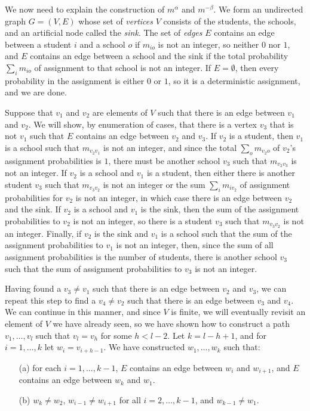 \documentclass[12pt]{article}
\theoremstyle{definition}
\begin{document}
We now need to explain the construction of $m^\alpha$ and
$m^{-\beta}$.  We form an undirected graph $G = (V,E)$ whose set of
\emph{vertices} $V$ consists of the students, the schools, and an
artificial node called the \emph{sink}. The set of \emph{edges} $E$
contains an edge between a student $i$ and a school $o$ if $m_{io}$ is
not an integer, so neither $0$ nor $1$, and $E$ contains an edge
between a school and the sink if the total probability $\sum_i m_{io}$
of assignment to that school is not an integer.  If $E = \emptyset$,
then every probability in the assignment is either $0$ or $1$, so it
is a deterministic assignment, and we are done.

Suppose that $v_1$ and $v_2$ are elements of $V$ such that there is an
edge between $v_1$ and $v_2$.  We will show, by enumeration of cases,
that there is a vertex $v_3$ that is not $v_1$ such that $E$ contains
an edge between $v_2$ and $v_3$. If $v_2$ is a student, then $v_1$ is
a school such that $m_{v_2v_1}$ is not an integer, and since the
total $\sum_o m_{v_2o}$ of $v_2$'s assignment probabilities is $1$,
there must be another school $v_3$ such that $m_{v_2v_3}$ is not an
integer.  If $v_2$ is a school and $v_1$ is a student, then either
there is another student $v_3$ such that $m_{v_3v_2}$ is not an
integer or the sum $\sum_i m_{iv_2}$ of assignment probabilities for
$v_2$ is not an integer, in which case there is an edge between $v_2$
and the sink.  If $v_2$ is a school and $v_1$ is the sink, then the
sum of the assignment probabilities to $v_2$ is not an integer, so
there is a student $v_3$ such that $m_{v_3v_2}$ is not an integer.
Finally, if $v_2$ is the sink and $v_1$ is a school such that the sum
of the assignment probabilities to $v_1$ is not an integer, then,
since the sum of all assignment probabilities is the number of
students, there is another school $v_3$ such that the sum of
assignment probabilities to $v_3$ is not an integer.

Having found a $v_3 \ne v_1$ such that there is an edge between $v_2$
and $v_3$, we can repeat this step to find a $v_4 \ne v_2$ such that
there is an edge between $v_3$ and $v_4$.  We can continue in this
manner, and since $V$ is finite, we will eventually revisit an element
of $V$ we have already seen, so we have shown how to construct a path
$v_1, \ldots, v_l$ such that $v_l = v_h$ for some $h < l - 2$.  Let
$k = l - h + 1$, and for $i = 1, \ldots, k$ let $w_i = v_{i + h - 1}$.
We have constructed $w_1, \ldots, w_k$ such that:
\begin{enumerate}
  \item[(a)] for each $i = 1, \ldots, k-1$, $E$ contains an edge
    between $w_i$ and $w_{i+1}$, and $E$ contains an edge between
    $w_k$ and $w_1$.
  \item[(b)] $w_k \ne w_2$, $w_{i-1} \ne w_{i+1}$ for all $i = 2,
    \ldots, k-1$, and $w_{k-1} \ne w_1$.
\end{enumerate}
\end{document}
